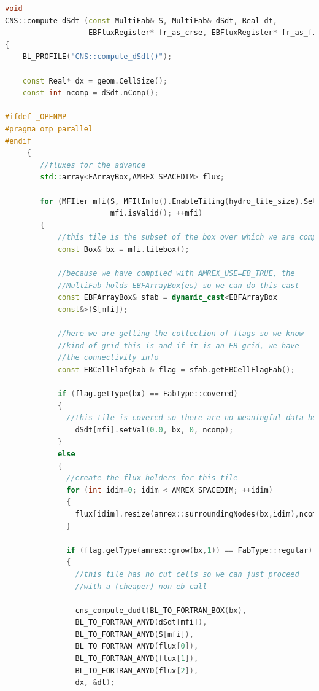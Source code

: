 \begin{lstlisting}[language=cpp]
void
CNS::compute_dSdt (const MultiFab& S, MultiFab& dSdt, Real dt,
                   EBFluxRegister* fr_as_crse, EBFluxRegister* fr_as_fine)
{
    BL_PROFILE("CNS::compute_dSdt()");

    const Real* dx = geom.CellSize();
    const int ncomp = dSdt.nComp();

#ifdef _OPENMP
#pragma omp parallel
#endif
     {
        //fluxes for the advance
        std::array<FArrayBox,AMREX_SPACEDIM> flux;

        for (MFIter mfi(S, MFItInfo().EnableTiling(hydro_tile_size).SetDynamic(true));
                        mfi.isValid(); ++mfi)
        {
            //this tile is the subset of the box over which we are computing
            const Box& bx = mfi.tilebox();

            //because we have compiled with AMREX_USE=EB_TRUE, the
            //MultiFab holds EBFArrayBox(es) so we can do this cast
            const EBFArrayBox& sfab = dynamic_cast<EBFArrayBox
            const&>(S[mfi]);
            
            //here we are getting the collection of flags so we know
            //kind of grid this is and if it is an EB grid, we have
            //the connectivity info
            const EBCellFlafgFab & flag = sfab.getEBCellFlagFab();

            if (flag.getType(bx) == FabType::covered) 
            {
              //this tile is covered so there are no meaningful data here
                dSdt[mfi].setVal(0.0, bx, 0, ncomp);
            } 
            else 
            {
              //create the flux holders for this tile
              for (int idim=0; idim < AMREX_SPACEDIM; ++idim) 
              {
                flux[idim].resize(amrex::surroundingNodes(bx,idim),ncomp);
              }

              if (flag.getType(amrex::grow(bx,1)) == FabType::regular)
              {
                //this tile has no cut cells so we can just proceed
                //with a (cheaper) non-eb call

                cns_compute_dudt(BL_TO_FORTRAN_BOX(bx),
                BL_TO_FORTRAN_ANYD(dSdt[mfi]),
                BL_TO_FORTRAN_ANYD(S[mfi]),
                BL_TO_FORTRAN_ANYD(flux[0]),
                BL_TO_FORTRAN_ANYD(flux[1]),
                BL_TO_FORTRAN_ANYD(flux[2]),
                dx, &dt);


\end{lstlisting}

